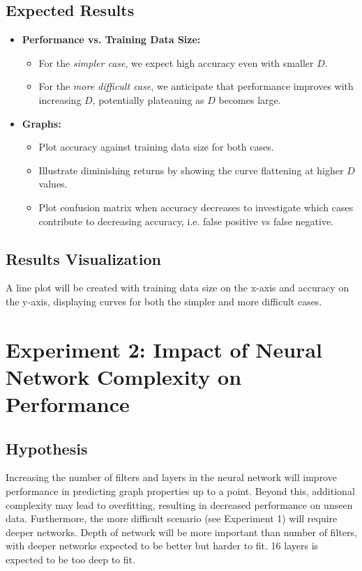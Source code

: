 \subsection{Expected Results}

\begin{itemize}
    \item \textbf{Performance vs. Training Data Size:}
    \begin{itemize}
        \item For the \textit{simpler case}, we expect high accuracy even with smaller $D$.
        \item For the \textit{more difficult case}, we anticipate that performance improves with increasing $D$, potentially plateauing as $D$ becomes large.
    \end{itemize}
    \item \textbf{Graphs:}
    \begin{itemize}
        \item Plot accuracy against training data size for both cases.
        \item Illustrate diminishing returns by showing the curve flattening at higher $D$ values.
        \item Plot confusion matrix when accuracy decreases to investigate which cases contribute to decreasing accuracy, i.e. false positive vs false negative.
    \end{itemize}
\end{itemize}

\subsection{Results Visualization}

A line plot will be created with training data size on the x-axis and accuracy on the y-axis, displaying curves for both the simpler and more difficult cases.


\section{Experiment 2: Impact of Neural Network Complexity on Performance}

\subsection{Hypothesis}

Increasing the number of filters and layers in the neural network will improve performance in predicting graph properties up to a point. Beyond this, additional complexity may lead to overfitting, resulting in decreased performance on unseen data. Furthermore, the more difficult scenario (see Experiment 1) will require deeper networks. Depth of network will be more important than number of filters, with deeper networks expected to be better but harder to fit. 16 layers is expected to be too deep to fit.

